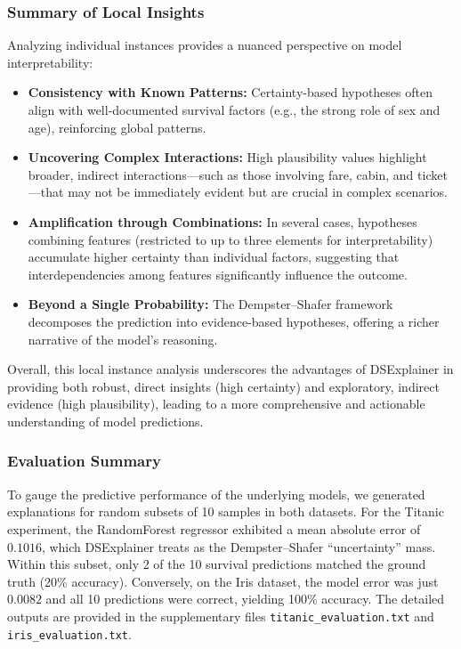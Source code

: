 \documentclass[acmlarge]{acmart}
\begin{document}
\subsubsection{Summary of Local Insights}

Analyzing individual instances provides a nuanced perspective on model interpretability:
\begin{itemize}
    \item \textbf{Consistency with Known Patterns:} Certainty-based hypotheses often align with well-documented survival factors (e.g., the strong role of sex and age), reinforcing global patterns.
    \item \textbf{Uncovering Complex Interactions:} High plausibility values highlight broader, indirect interactions—such as those involving fare, cabin, and ticket—that may not be immediately evident but are crucial in complex scenarios.
    \item \textbf{Amplification through Combinations:} In several cases, hypotheses combining features (restricted to up to three elements for interpretability) accumulate higher certainty than individual factors, suggesting that interdependencies among features significantly influence the outcome.
    \item \textbf{Beyond a Single Probability:} The Dempster–Shafer framework decomposes the prediction into evidence-based hypotheses, offering a richer narrative of the model’s reasoning.
\end{itemize}

Overall, this local instance analysis underscores the advantages of DSExplainer in providing both robust, direct insights (high certainty) and exploratory, indirect evidence (high plausibility), leading to a more comprehensive and actionable understanding of model predictions.
\subsubsection{Evaluation Summary}

To gauge the predictive performance of the underlying models, we generated explanations for random subsets of 10 samples in both datasets. For the Titanic experiment, the RandomForest regressor exhibited a mean absolute error of $0.1016$, which DSExplainer treats as the Dempster--Shafer ``uncertainty'' mass. Within this subset, only 2 of the 10 survival predictions matched the ground truth (20\% accuracy). Conversely, on the Iris dataset, the model error was just $0.0082$ and all 10 predictions were correct, yielding 100\% accuracy. The detailed outputs are provided in the supplementary files \texttt{titanic\_evaluation.txt} and \texttt{iris\_evaluation.txt}.
\end{document}
